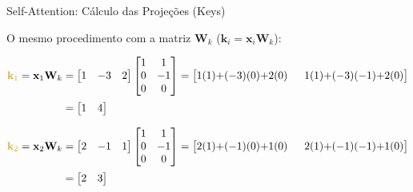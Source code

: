 \documentclass[aspectratio=169,xcolor=dvipsnames]{beamer}
\begin{document}
\begin{frame}[shrink=10]{Self-Attention: Cálculo das Projeções (\textcolor{kcolor}{Keys})}

O mesmo procedimento com a matriz $\mathbf{W}_k$ ($\mathbf{k}_i = \mathbf{x}_i \mathbf{W}_k$):

\begin{align*}
\textcolor{kcolor}{\mathbf{k}_1} = \mathbf{x}_1 \mathbf{W}_k &=
\begin{bmatrix} 1 & -3 & 2 \end{bmatrix}
\begin{bmatrix} 1 & 1 \\ 0 & -1 \\ 0 & 0 \end{bmatrix}
= \begin{bmatrix} 1(1){+}(-3)(0){+}2(0) & \;\; 1(1){+}(-3)(-1){+}2(0) \end{bmatrix} \\[2pt]
&= \begin{bmatrix} 1 & 4 \end{bmatrix}
\end{align*}

\vspace{4pt}

\begin{align*}
\textcolor{kcolor}{\mathbf{k}_2} = \mathbf{x}_2 \mathbf{W}_k &=
\begin{bmatrix} 2 & -1 & 1 \end{bmatrix}
\begin{bmatrix} 1 & 1 \\ 0 & -1 \\ 0 & 0 \end{bmatrix}
= \begin{bmatrix} 2(1){+}(-1)(0){+}1(0) & \;\; 2(1){+}(-1)(-1){+}1(0) \end{bmatrix} \\[2pt]
&= \begin{bmatrix} 2 & 3 \end{bmatrix}
\end{align*}

\end{frame}

\end{document}
